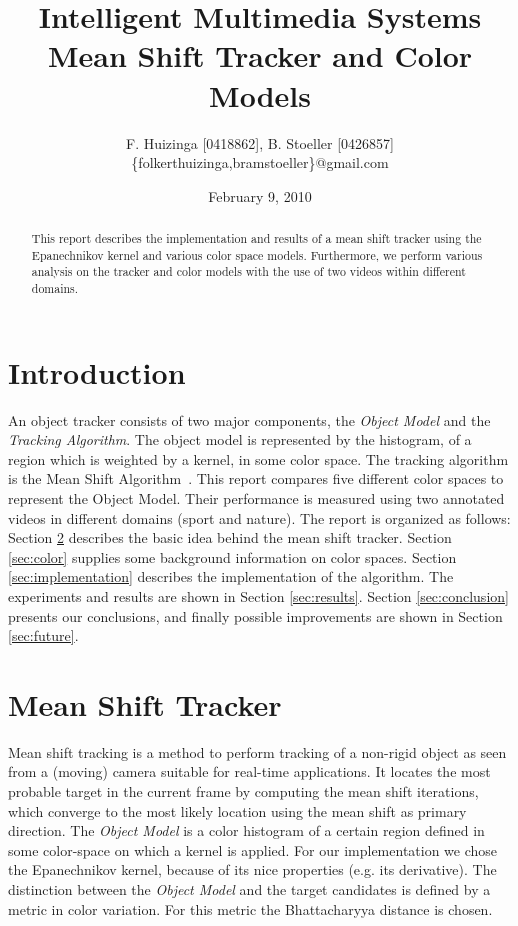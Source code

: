 \documentclass[11pt]{article}
\title{Intelligent Multimedia Systems \\ Mean Shift Tracker and Color Models}
\author{F. Huizinga [0418862], B. Stoeller [0426857] \\
      \{folkerthuizinga,bramstoeller\}@gmail.com}
\date{February 9, 2010}
\begin{document}
\maketitle

\begin{abstract}
This report describes the implementation and results of a mean shift tracker
using the Epanechnikov kernel and various color space models. Furthermore, we
perform various analysis on the tracker and color models with the use of two
videos within different domains.
\end{abstract}


\section{Introduction} \label{sec:intro}
An object tracker consists of two major components, the \emph{Object Model} and
the \emph{Tracking Algorithm}. The object model is represented by the
histogram, of a region which is weighted by a kernel, in some color space. The
tracking algorithm is the Mean Shift Algorithm~\cite{kernel-basedobject,
real-timetracking}. This report compares five different color spaces to
represent the Object Model. Their performance is measured using two annotated
videos in different domains (sport and nature). The report is organized as
follows: Section \ref{sec:meanshift} describes the basic idea behind the mean
shift tracker. Section \ref{sec:color} supplies some background information on
color spaces. Section \ref{sec:implementation} describes the implementation of
the algorithm. The experiments and results are shown in Section
\ref{sec:results}.  Section \ref{sec:conclusion} presents our conclusions, and
finally possible improvements are shown in Section \ref{sec:future}.

\section{Mean Shift Tracker} \label{sec:meanshift}
Mean shift tracking is a method to perform tracking of a non-rigid object as
seen from a (moving) camera suitable for real-time applications. It locates the
most probable target in the current frame by computing the mean shift
iterations, which converge to the most likely location using the mean shift as
primary direction. The \emph{Object Model} is a color histogram of a certain
region defined in some color-space on which a kernel is applied.  For our
implementation we chose the Epanechnikov kernel, because of its nice properties
(e.g. its derivative). The distinction between the \emph{Object Model} and the
target candidates is defined by a metric in color variation. For this metric
the Bhattacharyya distance is chosen. 
\end{document}
